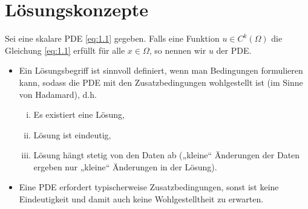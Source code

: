 \section{Lösungskonzepte}

\begin{df} \label{1.18}
	Sei eine skalare PDE \eqref{eq:1.1} gegeben.
	Falls eine Funktion $u \in C^k(\Omega)$ die Gleichung \eqref{eq:1.1} erfüllt für alle $x \in \Omega$, so nennen wir $u$  der PDE.
	\begin{note}[Wohlgestelltheit]
		\begin{itemize}
			\item
				Ein Lösungsbegriff ist sinnvoll definiert, wenn man Bedingungen formulieren kann, sodass die PDE mit den Zusatzbedingungen wohlgestellt ist (im Sinne von Hadamard), d.h.
				\begin{enumerate}[i)]
					\item
						Es existiert eine Lösung,
					\item
						Lösung ist eindeutig,
					\item
						Lösung hängt stetig von den Daten ab („kleine“ Änderungen der Daten ergeben nur „kleine“ Änderungen in der Lösung).
				\end{enumerate}
			\item
				Eine PDE erfordert typischerweise Zusatzbedingungen, sonst ist keine Eindeutigkeit und damit auch keine Wohlgestelltheit zu erwarten.


\end{itemize}
\end{note}
\end{df}
